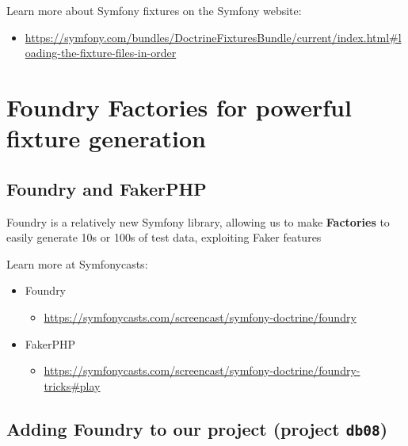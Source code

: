 \documentclass[a4paperpaper,openright]{book}
\providecommand{\tightlist}{%
  \setlength{\itemsep}{0pt}\setlength{\parskip}{0pt}}
\begin{document}
Learn more about Symfony fixtures on the Symfony website:

\begin{itemize}
\tightlist
\item
  \url{https://symfony.com/bundles/DoctrineFixturesBundle/current/index.html\#loading-the-fixture-files-in-order}
\end{itemize}

\hypertarget{foundry-factories-for-powerful-fixture-generation}{%
\chapter{\texorpdfstring{Foundry Factories for powerful fixture
generation\label{chapter_foundry_fixtures}}{Foundry Factories for powerful fixture generation}}\label{foundry-factories-for-powerful-fixture-generation}}

\hypertarget{foundry-and-fakerphp}{%
\section{Foundry and FakerPHP}\label{foundry-and-fakerphp}}

Foundry is a relatively new Symfony library, allowing us to make
\textbf{Factories} to easily generate 10s or 100s of test data,
exploiting Faker features

Learn more at Symfonycasts:

\begin{itemize}
\item
  Foundry

  \begin{itemize}
  \tightlist
  \item
    \url{https://symfonycasts.com/screencast/symfony-doctrine/foundry}
  \end{itemize}
\item
  FakerPHP

  \begin{itemize}
  \tightlist
  \item
    \url{https://symfonycasts.com/screencast/symfony-doctrine/foundry-tricks\#play}
  \end{itemize}
\end{itemize}

\hypertarget{adding-foundry-to-our-project-project-db08}{%
\section{\texorpdfstring{Adding Foundry to our project (project
\texttt{db08})}{Adding Foundry to our project (project db08)}}\label{adding-foundry-to-our-project-project-db08}}
\end{document}
